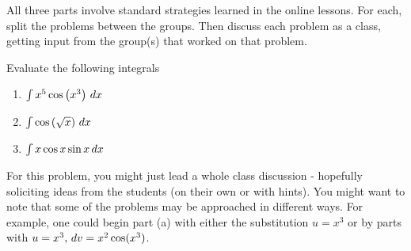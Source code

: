 \documentclass[]{ximera}
\begin{document}
\begin{instructorNotes}
All three parts involve standard strategies learned in the online lessons.  
For each, split the problems between the groups.  
Then discuss each problem as a class, getting input from the group(s) that worked on that problem.
\end{instructorNotes}







\begin{problem}
Evaluate the following integrals
	\begin{enumerate}
	
	\item  $\int x^5 \cos \left( x^3 \right) \,d x$
	\begin{freeResponse}
	
	\end{freeResponse}
	
	
	
	\item  $\int \cos \left( \sqrt{x} \right) \,d x$
	\begin{freeResponse}
	
	\end{freeResponse}
	
	
	
	\item  $\int x \cos x \sin x \,d x$
	\begin{freeResponse}
	
	\end{freeResponse}
	
	\end{enumerate}
	
\end{problem}

\begin{instructorNotes}
For this problem, you might just lead a whole class discussion - hopefully soliciting ideas from the students (on their own or with hints).  
You might want to note that some of the problems may be approached in different ways.  
For example, one could begin part (a) with either the substitution $u=x^3$ or by parts with $u=x^3, \,d v = x^2 \cos(x^3)$.
\end{instructorNotes}
\end{document}
